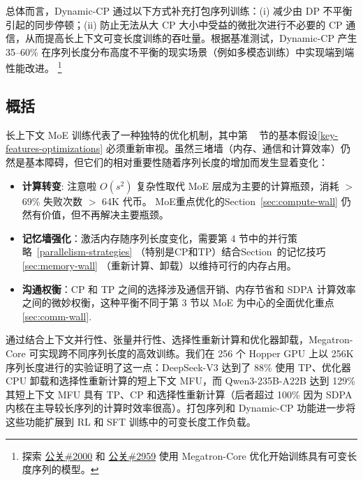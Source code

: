 总体而言，Dynamic-CP 通过以下方式补充打包序列训练：(i) 减少由 DP 不平衡引起的同步停顿；(ii) 防止无法从大 CP 大小中受益的微批次进行不必要的 CP 通信，从而提高长上下文可变长度训练的吞吐量。根据基准测试，Dynamic-CP 产生 35--60\% 在序列长度分布高度不平衡的现实场景（例如多模态训练）中实现端到端性能改进。 \footnote{探索 \href{https://github.com/NVIDIA/Megatron-LM/pull/2000}{公关\#2000} 和 \href{https://github.com/NVIDIA/Megatron-LM/pull/2959}{公关\#2959} 使用 Megatron-Core 优化开始训练具有可变长度序列的模型。}

\subsection{概括}

长上下文 MoE 训练代表了一种独特的优化机制，其中第 ~ 节的基本假设\ref{key-features-optimizations} 必须重新审视。虽然三堵墙（内存、通信和计算效率）仍然是基本障碍，但它们的相对重要性随着序列长度的增加而发生显着变化：

\begin{itemize}
    \item \textbf{计算转变}: 注意啦 $O(s^2)$ 复杂性取代 MoE 层成为主要的计算瓶颈，消耗 $>$ 69\% 失败次数 $>$ 64K 代币。 MoE重点优化的Section~\ref{sec:compute-wall} 仍然有价值，但不再解决主要瓶颈。
    
    \item \textbf{记忆墙强化}：激活内存随序列长度变化，需要第 4 节中的并行策略~\ref{parallelism-strategies} （特别是CP和TP）结合Section~的记忆技巧\ref{sec:memory-wall} （重新计算、卸载）以维持可行的内存占用。
    
    \item \textbf{沟通权衡}：CP 和 TP 之间的选择涉及通信开销、内存节省和 SDPA 计算效率之间的微妙权衡，这种平衡不同于第 3 节以 MoE 为中心的全面优化重点\ref{sec:comm-wall}.
\end{itemize}

通过结合上下文并行性、张量并行性、选择性重新计算和优化器卸载，Megatron-Core 可实现跨不同序列长度的高效训练。我们在 256 个 Hopper GPU 上以 256K 序列长度进行的实验证明了这一点：DeepSeek-V3 达到了 88\% 使用 TP、优化器 CPU 卸载和选择性重新计算的短上下文 MFU，而 Qwen3-235B-A22B 达到 129\% 其短上下文 MFU 具有 TP、CP 和选择性重新计算（后者超过 100\% 因为 SDPA 内核在主导较长序列的计算时效率很高）。打包序列和 Dynamic-CP 功能进一步将这些功能扩展到 RL 和 SFT 训练中的可变长度工作负载。



